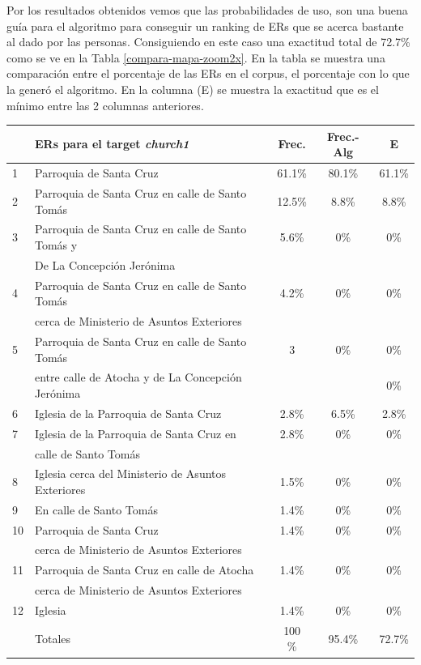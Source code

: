 Por los resultados obtenidos vemos que las probabilidades de uso, son una buena gu\'ia para el algoritmo para conseguir un ranking de ERs que se acerca bastante al dado por las personas. Consiguiendo en este caso una exactitud total de 72.7\% como se ve en la Tabla \ref{compara-mapa-zoom2x}. En la tabla se muestra una comparaci\'on entre el porcentaje de las ERs en el corpus, el porcentaje con lo que la gener\'o el algoritmo. En la columna (E) se muestra la exactitud que es el m\'inimo entre las 2 columnas anteriores.  

\begin{table}[h]
{\footnotesize
\begin{center}
\begin{tabular}{|l|l|c|c|c|}
\hline
&ERs para el target {\it church1} 					       &  Frec. & Frec.-Alg &E\\ \hline \hline
1&Parroquia de Santa Cruz        						   &	61.1\%  &   80.1\% &61.1\% \\ \hline
2&Parroquia de Santa Cruz en calle de Santo Tom\'as        &    12.5\%	&  8.8\% &8.8\% \\ \hline
3&Parroquia de Santa Cruz en calle de Santo Tom\'as y      &    5.6\%   & 0\% &0\% \\
&De La Concepci\'on Jer\'onima                             &            &  &\\ \hline
4&Parroquia de Santa Cruz en calle de Santo Tom\'as        &     4.2\%  & 0\% &0\% \\
&cerca de Ministerio de Asuntos Exteriores                 &            & &\\  \hline
5&Parroquia de Santa Cruz en calle de Santo Tom\'as        &	3       &	0\%	&0\% \\
&entre calle de Atocha y de La Concepci\'on Jer\'onima     &	        &	&	0\%	 \\  \hline
6&Iglesia de la Parroquia de Santa Cruz			           &	2.8\%	&6.5\%&2.8\% \\  \hline
7&Iglesia de la Parroquia de Santa Cruz	en      	       &	2.8\%	& 0\% &0\% \\  
&calle de Santo Tom\'as									   &	    	&	  &  \\ \hline
8&Iglesia cerca del Ministerio de Asuntos Exteriores       &	1.5\%	    &0\% & 0\% \\  \hline
9&En calle de Santo Tom\'as                                &   1.4\%    &0\% &0\% \\  \hline

10&Parroquia de Santa Cruz  				               &    1.4\%	&0\% &0\% \\  
&cerca de Ministerio de Asuntos Exteriores		           &	  		&&\\  \hline
11&Parroquia de Santa Cruz en calle de Atocha  		       &	1.4\%	&0\%& 0\% \\  
&cerca de Ministerio de Asuntos Exteriores		   	       &	    	&&\\  \hline
12&Iglesia						                           &    1.4\%	& 0\%& 0\% \\  \hline \hline
&Totales&                                                    	100 \%     &95.4\%	 &72.7\% \\  \hline


\end{tabular}
\end{center}}
\end{table}
